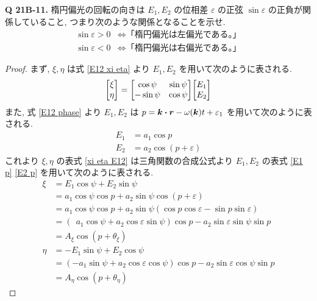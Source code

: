 \documentclass[a4paper,dvipdfmx]{jsarticle}
\theoremstyle{definition}
\begin{document}
\textbf{Q 21B-11.}
楕円偏光の回転の向きは $E_1, E_2$ の位相差 $\varepsilon$ の正弦 $\sin\varepsilon$ の正負が関係していること, つまり次のような関係となることを示せ.
\begin{align}
  \sin\varepsilon > 0 & \iff \textrm{「楕円偏光は左偏光である。」} \\
  \sin\varepsilon < 0 & \iff \textrm{「楕円偏光は右偏光である。」}
\end{align}
\begin{proof}
  まず, $\xi,\eta$ は式 \eqref{E12 xi eta} より $E_1, E_2$ を用いて次のように表される.
  \begin{align}
    \mqty[\xi \\ \eta] = \mqty[\cos\psi & \sin\psi \\ -\sin\psi & \cos\psi]\mqty[E_1 \\ E_2] \label{xi eta E12}
  \end{align}
  また, 式 \eqref{E12 phase} より $E_1, E_2$ は $p = \kk\vdot\rr - \omega(\kk)t + \varepsilon_1$ を用いて次のように表される.
  \begin{align}
    E_1 & = a_1\cos{p}            \label{E1 p}    \\
    E_2 & = a_2\cos(p + \varepsilon) \label{E2 p}
  \end{align}
  これより $\xi, \eta$ の表式 \eqref{xi eta E12} は三角関数の合成公式より $E_1, E_2$ の表式 \eqref{E1 p} \eqref{E2 p} を用いて次のように表される.
  \begin{align}
    \xi  & = E_1\cos\psi + E_2\sin\psi                                                                  \\
         & = a_1\cos\psi\cos{p} + a_2\sin\psi\cos(p + \varepsilon)                                      \\
         & = a_1\cos\psi\cos{p} + a_2\sin\psi(\cos{p}\cos\varepsilon - \sin{p}\sin\varepsilon)          \\
         & = (\ \  a_1\cos\psi + a_2\cos\varepsilon\sin\psi)\cos{p} - a_2\sin\varepsilon\sin\psi\sin{p} \\
         & = A_\xi\cos(p + \theta_\xi) \label{xi}                                                       \\
    \eta & = -E_1\sin\psi + E_2\cos\psi                                                                 \\
         & = (-a_1\sin\psi + a_2\cos\varepsilon\cos\psi)\cos{p} - a_2\sin\varepsilon\cos\psi\sin{p}     \\
         & = A_\eta\cos(p + \theta_\eta) \label{eta}
  \end{align}

\end{proof}
\end{document}
